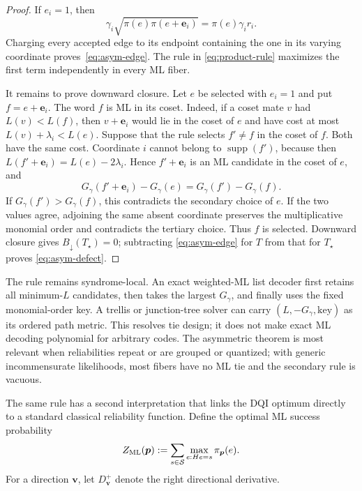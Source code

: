\documentclass[journal]{IEEEtran}
\theoremstyle{definition}
\theoremstyle{remark}
\begin{document}
\begin{proof}
If $e_i=1$, then
\begin{equation}
 \gamma_i\sqrt{\pi(e)\pi(e+\mathbf e_i)}=\pi(e)\gamma_i r_i.
 \label{eq:asym-edge-charge}
\end{equation}
Charging every accepted edge to its endpoint containing the one in its
varying coordinate proves~\eqref{eq:asym-edge}.  The rule in
\eqref{eq:product-rule} maximizes the first term independently in every ML
fiber.

It remains to prove downward closure.  Let $e$ be selected with $e_i=1$ and
put $f=e+\mathbf e_i$.  The word $f$ is ML in its coset.  Indeed, if a coset mate
$v$ had $L(v)<L(f)$, then $v+\mathbf e_i$ would lie in the coset of $e$ and have
cost at most $L(v)+\lambda_i<L(e)$.  Suppose that the rule selects
$f'\ne f$ in the coset of
$f$.  Both have the same cost.  Coordinate $i$ cannot belong to
$\operatorname{supp}(f')$, because then
$L(f'+\mathbf e_i)=L(e)-2\lambda_i$.  Hence $f'+\mathbf e_i$ is an ML candidate in the coset
of $e$, and
\begin{equation}
 G_\gamma(f'+\mathbf e_i)-G_\gamma(e)=G_\gamma(f')-G_\gamma(f).
 \label{eq:asym-G-transfer}
\end{equation}
If $G_\gamma(f')>G_\gamma(f)$, this contradicts the secondary choice of $e$.
If the two values agree, adjoining the same absent coordinate preserves the
multiplicative monomial order and contradicts the tertiary choice.  Thus $f$ is
selected.  Downward closure gives $B_\downarrow(T_\star)=0$; subtracting
\eqref{eq:asym-edge} for $T$ from that for $T_\star$ proves
\eqref{eq:asym-defect}.
\end{proof}

The rule remains syndrome-local.  An exact weighted-ML list decoder first
retains all minimum-$L$ candidates, then takes the largest $G_\gamma$, and finally
uses the fixed monomial-order key.  A trellis or junction-tree solver can
carry $(L,-G_\gamma,\text{key})$ as its ordered path metric.  This resolves tie
design; it does not make exact ML decoding polynomial for arbitrary codes.
The asymmetric theorem is most relevant when reliabilities repeat or are
grouped or quantized; with generic incommensurate likelihoods, most fibers have
no ML tie and the secondary rule is vacuous.

The same rule has a second interpretation that links the DQI optimum directly
to a standard classical reliability function.  Define the optimal ML success
probability
\begin{equation}
 Z_{\rm ML}(\boldsymbol p)
 :=\sum_{s\in\mathcal S}\max_{e:He=s}\pi_{\boldsymbol p}(e).
 \label{eq:asym-ZML}
\end{equation}
For a direction $\boldsymbol v$, let
$D_{\boldsymbol v}^{+}$ denote the right directional derivative.
\end{document}
